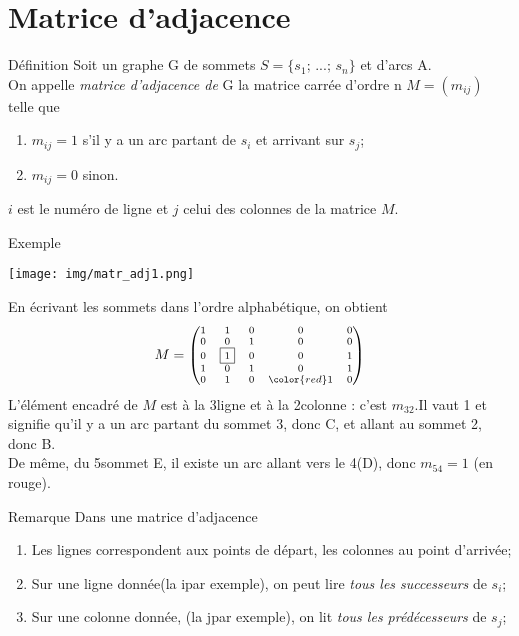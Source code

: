\documentclass[10pt]{beamer}
\begin{document}
\section{Matrice d'adjacence}
\begin{frame}{Définition}
Soit un graphe G de sommets  $S=\{s_1;\,...;\,s_n\}$ et d'arcs A.\\\pause 
On appelle \textit{matrice d'adjacence de} G la matrice carrée d'ordre n $M=(m_{ij})$ telle que \pause
\begin{enumerate}[--]
	\item 	$m_{ij}=1$ s'il y a un arc partant de $s_i$ et arrivant sur $s_j$;\pause
	\item 	$m_{ij}=0$ sinon.\pause
\end{enumerate}
$i$ est le numéro de ligne et $j$ celui des colonnes de la matrice $M$.
\end{frame}
\begin{frame}{Exemple}
\begin{center}
\texttt{[image: img/matr\_adj1.png]}
\end{center}
En écrivant les sommets dans l'ordre alphabétique, on obtient\pause
$$\scriptsize M=\begin{pmatrix}
1 &1 &0 & 0&0  \\
0 & 0&1 &0 &0  \\
0 & \boxed{1} & 0 & 0 & 1\\
1 & 0 & 1 & 0 & 1\\
0 & 1 & 0 &{\color{red}1} & 0 
\end{pmatrix}$$
L'élément encadré de $M$ est à la 3\eme ligne et à la 2\eme colonne : c'est $m_{32}$.\pause Il vaut 1 et signifie qu'il y a un arc partant du sommet 3, donc C, et allant au sommet 2, donc B.\\\pause
De même, du 5\eme sommet E, il existe un arc allant vers le 4\eme (D), donc $m_{54}=1$ (en rouge).\pause
\end{frame}
\begin{frame}{Remarque}
Dans une matrice d'adjacence\pause
\begin{enumerate}[--]
	\item 	Les lignes correspondent aux points de départ, les colonnes au point d'arrivée;\pause
	\item 	Sur une ligne donnée(la i\eme par exemple), on peut lire \textit{tous les successeurs} de $s_i$;\pause
	\item 	Sur une colonne donnée, (la j\eme par exemple), on lit \textit{tous les prédécesseurs} de $s_j$;
\end{enumerate}
\end{frame}
\end{document}
